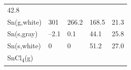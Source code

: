 \documentclass[
  9pt,
]{extbook}
\theoremstyle{definition}
\theoremstyle{definition}
\theoremstyle{definition}
\theoremstyle{remark}
\begin{document}
\begin{longtable}[]{@{}lllll@{}}
\begin{minipage}[t]{0.18\columnwidth}
42.8\strut
\end{minipage}\tabularnewline
\begin{minipage}[t]{0.10\columnwidth}\raggedright
Sn(g,white)\strut
\end{minipage} & \begin{minipage}[t]{0.19\columnwidth}\raggedright
301\strut
\end{minipage} & \begin{minipage}[t]{0.20\columnwidth}\raggedright
266.2\strut
\end{minipage} & \begin{minipage}[t]{0.18\columnwidth}\raggedright
168.5\strut
\end{minipage} & \begin{minipage}[t]{0.18\columnwidth}\raggedright
21.3\strut
\end{minipage}\tabularnewline
\begin{minipage}[t]{0.10\columnwidth}\raggedright
Sn(s,gray)\strut
\end{minipage} & \begin{minipage}[t]{0.19\columnwidth}\raggedright
--2.1\strut
\end{minipage} & \begin{minipage}[t]{0.20\columnwidth}\raggedright
0.1\strut
\end{minipage} & \begin{minipage}[t]{0.18\columnwidth}\raggedright
44.1\strut
\end{minipage} & \begin{minipage}[t]{0.18\columnwidth}\raggedright
25.8\strut
\end{minipage}\tabularnewline
\begin{minipage}[t]{0.10\columnwidth}\raggedright
Sn(s,white)\strut
\end{minipage} & \begin{minipage}[t]{0.19\columnwidth}\raggedright
0\strut
\end{minipage} & \begin{minipage}[t]{0.20\columnwidth}\raggedright
0\strut
\end{minipage} & \begin{minipage}[t]{0.18\columnwidth}\raggedright
51.2\strut
\end{minipage} & \begin{minipage}[t]{0.18\columnwidth}\raggedright
27.0\strut
\end{minipage}\tabularnewline
\begin{minipage}[t]{0.10\columnwidth}\raggedright
SnCl\textsubscript{4}(g)\strut

\end{minipage}
\end{longtable}
\end{document}

